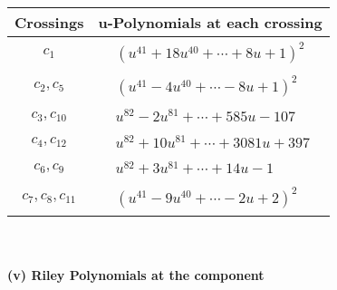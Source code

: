 \documentclass[1p]{elsarticle_modified}
\theoremstyle{definition}
\begin{document}
\begin{tabular}{m{50pt}|m{274pt}}
Crossings & \hspace{64pt}u-Polynomials at each crossing \\
\hline $$\begin{aligned}c_{1}\end{aligned}$$&$\begin{aligned}
&(u^{41}+18 u^{40}+\cdots+8 u+1)^{2}
\end{aligned}$\\
\hline $$\begin{aligned}c_{2},c_{5}\end{aligned}$$&$\begin{aligned}
&(u^{41}-4 u^{40}+\cdots-8 u+1)^{2}
\end{aligned}$\\
\hline $$\begin{aligned}c_{3},c_{10}\end{aligned}$$&$\begin{aligned}
&u^{82}-2 u^{81}+\cdots+585 u-107
\end{aligned}$\\
\hline $$\begin{aligned}c_{4},c_{12}\end{aligned}$$&$\begin{aligned}
&u^{82}+10 u^{81}+\cdots+3081 u+397
\end{aligned}$\\
\hline $$\begin{aligned}c_{6},c_{9}\end{aligned}$$&$\begin{aligned}
&u^{82}+3 u^{81}+\cdots+14 u-1
\end{aligned}$\\
\hline $$\begin{aligned}c_{7},c_{8},c_{11}\end{aligned}$$&$\begin{aligned}
&(u^{41}-9 u^{40}+\cdots-2 u+2)^{2}
\end{aligned}$\\
\hline
\end{tabular}\\~\\
\newpage\renewcommand{\arraystretch}{1}
\flushleft \textbf{(v) Riley Polynomials at the component}\newline \\
\end{document}
